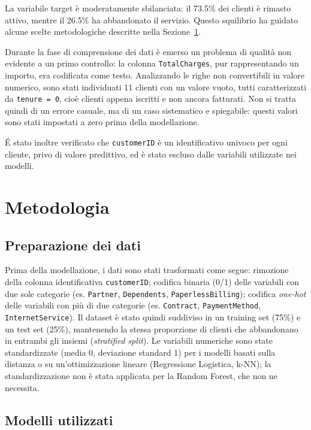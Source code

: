 \documentclass[11pt,a4paper]{article}
\begin{document}
La variabile target è moderatamente sbilanciata: il 73.5\% dei clienti è rimasto attivo, mentre il 26.5\% ha abbandonato il servizio. Questo squilibrio ha guidato alcune scelte metodologiche descritte nella Sezione~\ref{sec:metodologia}.

Durante la fase di comprensione dei dati è emerso un problema di qualità non evidente a un primo controllo: la colonna \texttt{TotalCharges}, pur rappresentando un importo, era codificata come testo. Analizzando le righe non convertibili in valore numerico, sono stati individuati 11 clienti con un valore vuoto, tutti caratterizzati da \texttt{tenure = 0}, cio\`e clienti appena iscritti e non ancora fatturati. Non si tratta quindi di un errore casuale, ma di un caso sistematico e spiegabile: questi valori sono stati impostati a zero prima della modellazione.

\'E stato inoltre verificato che \texttt{customerID} \`e un identificativo univoco per ogni cliente, privo di valore predittivo, ed \`e stato escluso dalle variabili utilizzate nei modelli.

\section{Metodologia}
\label{sec:metodologia}

\subsection{Preparazione dei dati}

Prima della modellazione, i dati sono stati trasformati come segue: rimozione della colonna identificativa \texttt{customerID}; codifica binaria (0/1) delle variabili con due sole categorie (es. \texttt{Partner}, \texttt{Dependents}, \texttt{PaperlessBilling}); codifica \emph{one-hot} delle variabili con pi\`u di due categorie (es. \texttt{Contract}, \texttt{PaymentMethod}, \texttt{InternetService}). Il dataset \`e stato quindi suddiviso in un training set (75\%) e un test set (25\%), mantenendo la stessa proporzione di clienti che abbandonano in entrambi gli insiemi (\emph{stratified split}). Le variabili numeriche sono state standardizzate (media 0, deviazione standard 1) per i modelli basati sulla distanza o su un'ottimizzazione lineare (Regressione Logistica, k-NN); la standardizzazione non \`e stata applicata per la Random Forest, che non ne necessita.

\subsection{Modelli utilizzati}
\end{document}
